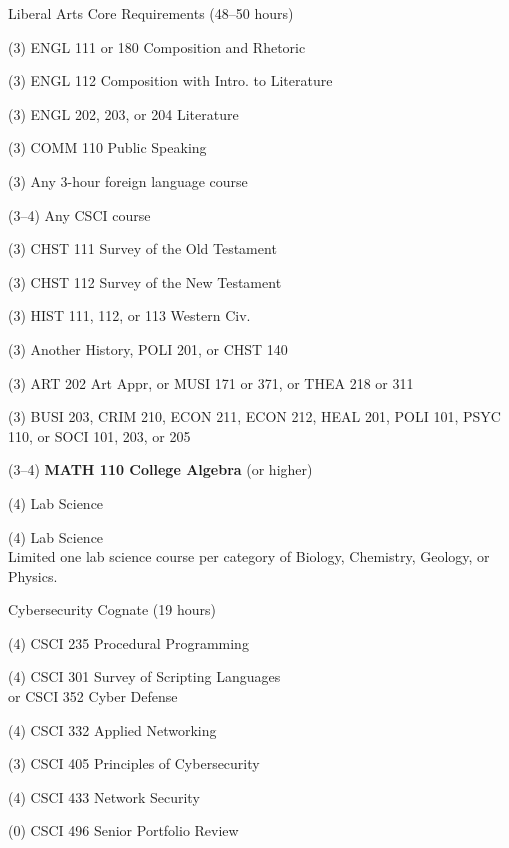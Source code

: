 \begin{reqgroup}{Liberal Arts Core Requirements (48--50 hours)}
\begin{checklist}
\begin{minipage}[t]{0.5\linewidth}
	\item (3) ENGL 111 or 180 Composition and Rhetoric
	\item (3) ENGL 112 Composition with Intro\@. to Literature
	\item (3) ENGL 202, 203, or 204 Literature
	\item (3) COMM 110 Public Speaking
	\item (3) Any 3-hour foreign language course
	\item (3--4) Any CSCI course
	\item (3) CHST 111  Survey of the Old Testament
	\item (3) CHST 112  Survey of the New Testament
	\item (3) HIST 111, 112, or 113 Western Civ.
\end{minipage}
\begin{minipage}[t]{0.5\linewidth}
	\item (3) Another History, POLI 201, or CHST 140
	\item (3) ART 202 Art Appr, or MUSI 171 or 371, or THEA 218 or 311
	\item (3) BUSI 203, CRIM 210, ECON 211, ECON 212, HEAL 201, POLI 101, PSYC 110, or SOCI 101, 203, or 205
	\item (3--4) \textbf{MATH 110 College Algebra} (or higher)
	\item (4) Lab Science
	\item (4) Lab Science\\Limited one lab science course per category of Biology, Chemistry,
Geology, or Physics.
\end{minipage}
\end{checklist}
\end{reqgroup}


\begin{reqgroup}{Cybersecurity Cognate (19 hours)}%
\begin{checklist}%
\begin{minipage}[t]{0.5\linewidth}%
	\item (4) CSCI 235 Procedural Programming
	\item (4) CSCI 301 Survey of Scripting Languages\\
		or CSCI 352 Cyber Defense
	\item (4) CSCI 332 Applied Networking
\end{minipage}%
\begin{minipage}[t]{0.5\linewidth}
	\item (3) CSCI 405 Principles of Cybersecurity
	\item (4) CSCI 433 Network Security
	\item (0) CSCI 496 Senior Portfolio Review
\end{minipage}
\end{checklist}
\end{reqgroup}

